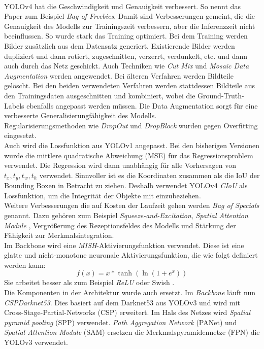 \documentclass[conference]{IEEEtran}
\begin{document}
	\\
	YOLOv4 hat die Geschwindigkeit und Genauigkeit verbessert. So nennt das Paper \cite{b2} zum Beispiel \textit{Bag of Freebies}. Damit sind Verbesserungen gemeint, die die Genauigkeit des Modells zur Trainingszeit verbessern, aber die Inferenzzeit nicht beeinflussen. So wurde stark das Training optimiert. Bei dem Training werden Bilder zusätzlich aus dem Datensatz generiert. Existierende Bilder werden dupliziert und dann rotiert, zugeschnitten, verzerrt, verdunkelt, etc. und dann auch durch das Netz geschickt. 
	Auch Techniken wie \textit{Cut Mix} \cite{cutmix} und \textit{Mosaic Data Augmentation} werden angewendet. Bei älteren Verfahren werden Bildteile gelöscht. Bei den beiden verwendeten Verfahren werden stattdessen Bildteile aus den Trainingsdaten ausgeschnitten und kombiniert, wobei die Ground-Truth-Labels ebenfalls angepasst werden müssen. Die Data Augmentation sorgt für eine verbesserte Generalisierungfähigkeit des Modells.\\
	Regularisierungsmethoden wie \textit{DropOut} \cite{dropout} und \textit{DropBlock} \cite{dropblock} wurden gegen Overfitting eingesetzt.\\
	Auch wird die Lossfunktion aus YOLOv1 angepasst. Bei den bisherigen Versionen wurde die mittlere quadratische Abweichung (MSE) für das Regressionsproblem verwendet. Die Regression wird dann unabhängig für alle Vorhersagen von $t_x, t_y, t_w, t_h$ verwendet. Sinnvoller ist es die Koordinaten zusammen als die IoU der Bounding Boxen in Betracht zu ziehen. Deshalb verwendet YOLOv4 \textit{CIoU} \cite{diou} als Lossfunktion, um die Integrität der Objekte mit einzubeziehen.\\
	Weitere Verbesserungen die auf Kosten der Laufzeit gehen werden \textit{Bag of Specials} genannt. Dazu gehören zum Beispiel \textit{Squeeze-and-Excitation}, \textit{Spatial Attention Module} \cite{cbam}, Vergrößerung des Rezeptionsfeldes des Modells und Stärkung der Fähigkeit zur Merkmalsintegration.\\
	Im Backbone wird eine \textit{MISH}-Aktivierungsfunktion \cite{b7} verwendet. Diese ist eine glatte und nicht-monotone neuronale Aktivierungsfunktion, die wie folgt definiert werden kann:
	\[ f(x) = x* \tanh (\ln (1+e^x)) \]
	Sie arbeitet besser als zum Beispiel \textit{ReLU} oder Swish \cite{b7}.\\
	Die Komponenten in der Architektur wurde auch ersetzt. Im \textit{Backbone} läuft nun \textit{CSPDarknet53}. Dies basiert auf dem Darknet53 aus YOLOv3 und wird mit Cross-Stage-Partial-Networks (CSP)\cite{csp} erweitert. Im Hals des Netzes wird \textit{Spatial pyramid pooling} (SPP)\cite{b9} verwendet. \textit{Path Aggregation Network} (PANet)\cite{b10} und \textit{Spatial Attention Module} (SAM)\cite{cbam} ersetzen die Merkmalspyramidennetze (FPN) die YOLOv3 verwendet.\\
\end{document}
